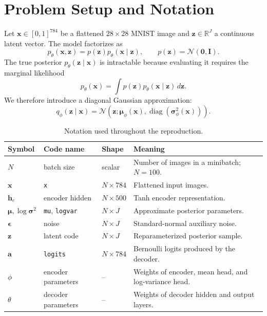 \documentclass[11pt]{article}
\newcommand{\R}{\mathbb{R}}
\newcommand{\code}[1]{\texttt{#1}}
\begin{document}
\section{Problem Setup and Notation}

Let $\bm{x}\in[0,1]^{784}$ be a flattened $28\times 28$ MNIST image and $\bm{z}\in\R^J$ a continuous latent vector. The model factorizes as
\begin{equation}
  p_\theta(\bm{x},\bm{z})=p(\bm{z})p_\theta(\bm{x}\mid\bm{z}),
  \qquad p(\bm{z})=\mathcal{N}(\bm{0},\bm{I}).
  \label{eq:joint}
\end{equation}
The true posterior $p_\theta(\bm{z}\mid\bm{x})$ is intractable because evaluating it requires the marginal likelihood
\begin{equation}
  p_\theta(\bm{x})=\int p(\bm{z})p_\theta(\bm{x}\mid\bm{z})\,d\bm{z}.
\end{equation}
We therefore introduce a diagonal Gaussian approximation:
\begin{equation}
  q_\phi(\bm{z}\mid\bm{x})=
  \mathcal{N}\!\left(\bm{z};\bm{\mu}_\phi(\bm{x}),
  \operatorname{diag}\!\left(\bm{\sigma}_\phi^2(\bm{x})\right)\right).
  \label{eq:q}
\end{equation}

\begin{table}[H]
\centering
\caption{Notation used throughout the reproduction.}
\label{tab:notation}
\begin{tabularx}{0.94\textwidth}{@{}l l l X@{}}
\toprule
Symbol & Code name & Shape & Meaning \\
\midrule
$N$ & batch size & scalar & Number of images in a minibatch; $N=100$. \\
$\bm{x}$ & \code{x} & $N\times784$ & Flattened input images. \\
$\bm{h}_e$ & encoder hidden & $N\times500$ & Tanh encoder representation. \\
$\bm{\mu},\log\bm{\sigma}^2$ & \code{mu}, \code{logvar} & $N\times J$ & Approximate posterior parameters. \\
$\bm{\epsilon}$ & noise & $N\times J$ & Standard-normal auxiliary noise. \\
$\bm{z}$ & latent code & $N\times J$ & Reparameterized posterior sample. \\
$\bm{a}$ & \code{logits} & $N\times784$ & Bernoulli logits produced by the decoder. \\
$\phi$ & encoder parameters & -- & Weights of encoder, mean head, and log-variance head. \\
$\theta$ & decoder parameters & -- & Weights of decoder hidden and output layers. \\
\bottomrule
\end{tabularx}
\end{table}
\end{document}
